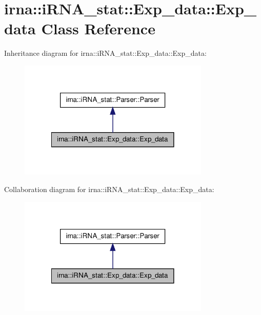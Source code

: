 \hypertarget{classirna_1_1iRNA__stat_1_1Exp__data_1_1Exp__data}{
\section{irna\-:\-:i\-R\-N\-A\-\_\-stat\-:\-:\-Exp\-\_\-data\-:\-:\-Exp\-\_\-data \-Class \-Reference}
\label{classirna_1_1iRNA__stat_1_1Exp__data_1_1Exp__data}
}


\-Inheritance diagram for irna\-:\-:i\-R\-N\-A\-\_\-stat\-:\-:\-Exp\-\_\-data\-:\-:\-Exp\-\_\-data\-:\nopagebreak
\begin{figure}[H]
\begin{center}
\leavevmode
\includegraphics[width=258pt]{classirna_1_1iRNA__stat_1_1Exp__data_1_1Exp__data__inherit__graph}
\end{center}
\end{figure}


\-Collaboration diagram for irna\-:\-:i\-R\-N\-A\-\_\-stat\-:\-:\-Exp\-\_\-data\-:\-:\-Exp\-\_\-data\-:\nopagebreak
\begin{figure}[H]
\begin{center}
\leavevmode
\includegraphics[width=258pt]{classirna_1_1iRNA__stat_1_1Exp__data_1_1Exp__data__coll__graph}
\end{center}
\end{figure}
